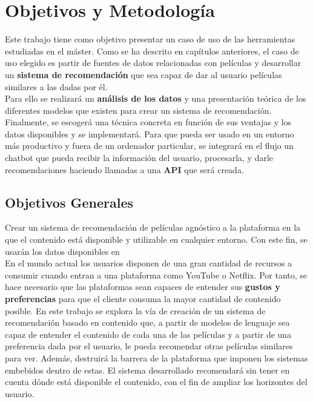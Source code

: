 
\chapter{Objetivos y Metodología}\label{chap:objetivos}

Este trabajo tiene como objetivo presentar un caso de uso de las herramientas estudiadas en el máster. Como se ha descrito en capítulos anteriores, el caso de uso elegido es partir de fuentes de datos relacionadas con películas y desarrollar un \textbf{sistema de recomendación} que sea capaz de dar al usuario películas similares a las dadas por él.\\

Para ello se realizará un \textbf{análisis de los datos} y una presentación teórica de los diferentes modelos que existen para crear un sistema de recomendación. Finalmente, se escogerá una técnica concreta en función de sus ventajas y los datos disponibles y se implementará. Para que pueda ser usado en un entorno más productivo y fuera de un ordenador particular, se integrará en el flujo un chatbot que pueda recibir la información del usuario, procesarla, y darle recomendaciones haciendo llamadas a una \textbf{API} que será creada.



\section{Objetivos Generales}\label{sec:objgenerales}

Crear un sistema de recomendación de películas agnóstico a la plataforma en la que el contenido está disponible y utilizable en cualquier entorno. Con este fin, se usarán los datos disponibles en \cite{kaggle}\\

En el mundo actual los usuarios disponen de una gran cantidad de recursos a consumir cuando entran a una plataforma como YouTube o Netflix. Por tanto, se hace necesario que las plataformas sean capaces de entender sus \textbf{gustos y preferencias} para que el cliente consuma la mayor cantidad de contenido posible. En este trabajo se explora la vía de creación de un sistema de recomendación basado en contenido que, a partir de modelos de lenguaje sea capaz de entender el contenido de cada una de las películas y a partir de una preferencia dada por el usuario, le pueda recomendar otras películas similares para ver. Además, destruirá la barrera de la plataforma que imponen los sistemas embebidos dentro de estas. El sistema desarrollado recomendará sin tener en cuenta dónde está disponible el contenido, con el fin de ampliar los horizontes del usuario.\\

